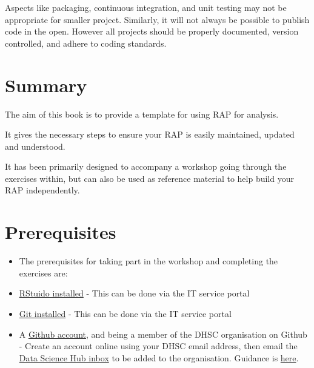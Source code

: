 \documentclass[
  letterpaper,
]{book}
\begin{document}
Aspects like packaging, continuous integration, and unit testing may not
be appropriate for smaller project. Similarly, it will not always be
possible to publish code in the open. However all projects should be
properly documented, version controlled, and adhere to coding standards.


\hypertarget{summary}{%
\chapter{Summary}\label{summary}}

The aim of this book is to provide a template for using RAP for
analysis.

It gives the necessary steps to ensure your RAP is easily maintained,
updated and understood.

It has been primarily designed to accompany a workshop going through the
exercises within, but can also be used as reference material to help
build your RAP independently.


\hypertarget{prerequisites}{%
\chapter{Prerequisites}\label{prerequisites}}

\begin{itemize}
\item
  The prerequisites for taking part in the workshop and completing the
  exercises are:
\item
  \href{https://intranet.dhsc.gov.uk/how-to/seek-it-support/it-support-from-dxc/}{RStuido
  installed} - This can be done via the IT service portal
\item
  \href{https://intranet.dhsc.gov.uk/how-to/seek-it-support/it-support-from-dxc/}{Git
  installed} - This can be done via the IT service portal
\item
  A \href{https://github.com/}{Github account}, and being a member of
  the DHSC organisation on Github - Create an account online using your
  DHSC email address, then email the \href{datascience@dhsc.gov.uk}{Data
  Science Hub inbox} to be added to the organisation. Guidance is
  \href{https://healthsharedservice.sharepoint.com/:f:/r/sites/DataScience/Shared\%20Documents/FAQs\%20and\%20known\%20issues?csf=1\&web=1\&e=VabVtH}{here}.
\end{itemize}
\end{document}
